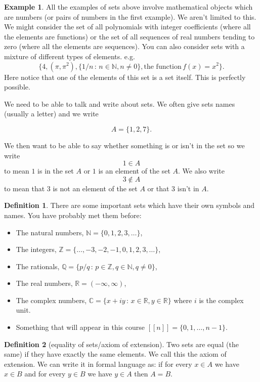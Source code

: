 \documentclass[
]{book}
\theoremstyle{definition}
\newtheorem{definition}{Definition}[chapter]
\theoremstyle{definition}
\newtheorem{example}{Example}[chapter]
\theoremstyle{definition}
\theoremstyle{definition}
\theoremstyle{remark}
\begin{document}
\begin{example}
All the examples of sets above involve mathematical objects which are numbers (or pairs of numbers in the first example). We aren't limited to this. We might consider the set of all polynomials with integer coefficients (where all the elements are functions) or the set of all sequences of real numbers tending to zero (where all the elements are sequences). You can also consider sets with a mixture of different types of elements. e.g.~
\[ \{ 4, (\pi, \pi^2), \{1/n \,:\, n \in \mathbb{N}, n \neq 0 \}, \mbox{the function}\, f(x) = x^2\}.  \] Here notice that one of the elements of this set is a set itself. This is perfectly possible.
\end{example}

We need to be able to talk and write about sets. We often give sets names (usually a letter) and we write

\[ A = \{1,2,7\}.  \]

We then want to be able to say whether something is or isn't in the set so we write
\[ 1 \in A  \] to mean \(1\) is in the set \(A\) or \(1\) is an element of the set \(A\). We also write
\[ 3 \notin A \] to mean that \(3\) is not an element of the set \(A\) or that 3 isn't in \(A\).

\begin{definition}

There are some important sets which have their own symbols and names. You have probably met them before:

\begin{itemize}
\item
  The natural numbers, \(\mathbb{N}= \{0, 1,2,3,\dots\}\),
\item
  The integers, \(\mathbb{Z} = \{ \dots, -3, -2, -1, 0, 1, 2, 3, \dots \}\),
\item
  The rationals, \(\mathbb{Q} = \{p/q \,:\, p \in \mathbb{Z}, q \in \mathbb{N}, q \neq 0\}\),
\item
  The real numbers, \(\mathbb{R} = (-\infty, \infty)\),
\item
  The complex numbers, \(\mathbb{C} = \{x+iy \,:\, x \in \mathbb{R}, y \in \mathbb{R}\}\) where \(i\) is the complex unit.
\item
  Something that will appear in this course \([[n]]= \{0,1,\dots, n-1\}\).
\end{itemize}

\end{definition}

\begin{definition}[equality of sets/axiom of extension]
Two sets are equal (the same) if they have exactly the same elements. We call this the axiom of extension. We can write it in formal language as: if for every \(x \in A\) we have \(x \in B\) and for every \(y \in B\) we have \(y \in A\) then \(A=B\).
\end{definition}
\end{document}
